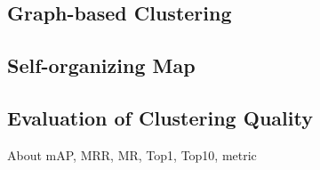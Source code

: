 \subsection{Graph-based Clustering}

\subsection{Self-organizing Map}

\subsection{Evaluation of Clustering Quality}
About mAP, MRR, MR, Top1, Top10, metric


\newpage


